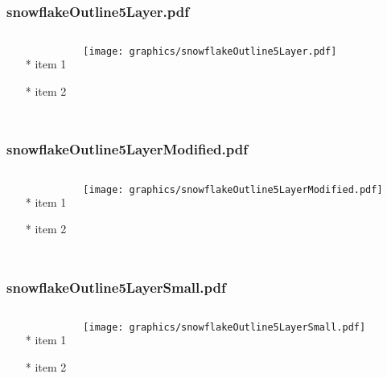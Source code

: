 \documentclass{beamer}
\begin{document}
\begin{frame} \frametitle{snowflakeOutline5Layer.pdf}
    \begin{columns}[c]
        \begin{itemize}
            \item[*] item 1
            \item[*] item 2
        \end{itemize}
        \begin{minipage}{\linewidth}
            \begin{center}
            \texttt{[image: graphics/snowflakeOutline5Layer.pdf]}
            \label{gfx:snowflakeOutline5Layer.pdf}
            \end{center}
        \end{minipage}
    \end{columns}
\end{frame}
\begin{frame} \frametitle{snowflakeOutline5LayerModified.pdf}
    \begin{columns}[c]
        \begin{itemize}
            \item[*] item 1
            \item[*] item 2
        \end{itemize}
        \begin{minipage}{\linewidth}
            \begin{center}
            \texttt{[image: graphics/snowflakeOutline5LayerModified.pdf]}
            \label{gfx:snowflakeOutline5LayerModified.pdf}
            \end{center}
        \end{minipage}
    \end{columns}
\end{frame}
\begin{frame} \frametitle{snowflakeOutline5LayerSmall.pdf}
    \begin{columns}[c]
        \begin{itemize}
            \item[*] item 1
            \item[*] item 2
        \end{itemize}
        \begin{minipage}{\linewidth}
            \begin{center}
            \texttt{[image: graphics/snowflakeOutline5LayerSmall.pdf]}
            \label{gfx:snowflakeOutline5LayerSmall.pdf}
            \end{center}
        \end{minipage}
    \end{columns}
\end{frame}
\end{document}
